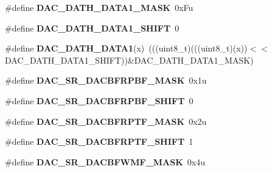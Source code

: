 \begin{DoxyCompactItemize}
\item 
\#define {\bfseries D\+A\+C\+\_\+\+D\+A\+T\+H\+\_\+\+D\+A\+T\+A1\+\_\+\+M\+A\+SK}~0x\+Fu\hypertarget{group__DAC__Register__Masks_ga98c0e999ae86d666b5d6fa8df700ba6f}{}\label{group__DAC__Register__Masks_ga98c0e999ae86d666b5d6fa8df700ba6f}

\item 
\#define {\bfseries D\+A\+C\+\_\+\+D\+A\+T\+H\+\_\+\+D\+A\+T\+A1\+\_\+\+S\+H\+I\+FT}~0\hypertarget{group__DAC__Register__Masks_ga0056432036b350d3839554982acfbff1}{}\label{group__DAC__Register__Masks_ga0056432036b350d3839554982acfbff1}

\item 
\#define {\bfseries D\+A\+C\+\_\+\+D\+A\+T\+H\+\_\+\+D\+A\+T\+A1}(x)~(((uint8\+\_\+t)(((uint8\+\_\+t)(x))$<$$<$D\+A\+C\+\_\+\+D\+A\+T\+H\+\_\+\+D\+A\+T\+A1\+\_\+\+S\+H\+I\+FT))\&D\+A\+C\+\_\+\+D\+A\+T\+H\+\_\+\+D\+A\+T\+A1\+\_\+\+M\+A\+SK)\hypertarget{group__DAC__Register__Masks_ga22ebc926dfe59f28a37b532767780fbc}{}\label{group__DAC__Register__Masks_ga22ebc926dfe59f28a37b532767780fbc}

\item 
\#define {\bfseries D\+A\+C\+\_\+\+S\+R\+\_\+\+D\+A\+C\+B\+F\+R\+P\+B\+F\+\_\+\+M\+A\+SK}~0x1u\hypertarget{group__DAC__Register__Masks_ga5af56fd75a9c5b74fe07c8f303d452aa}{}\label{group__DAC__Register__Masks_ga5af56fd75a9c5b74fe07c8f303d452aa}

\item 
\#define {\bfseries D\+A\+C\+\_\+\+S\+R\+\_\+\+D\+A\+C\+B\+F\+R\+P\+B\+F\+\_\+\+S\+H\+I\+FT}~0\hypertarget{group__DAC__Register__Masks_ga5581f254327f3d4e57b161b5c771fb1c}{}\label{group__DAC__Register__Masks_ga5581f254327f3d4e57b161b5c771fb1c}

\item 
\#define {\bfseries D\+A\+C\+\_\+\+S\+R\+\_\+\+D\+A\+C\+B\+F\+R\+P\+T\+F\+\_\+\+M\+A\+SK}~0x2u\hypertarget{group__DAC__Register__Masks_ga662e824677c1a7a94ddd36e90f3d37d5}{}\label{group__DAC__Register__Masks_ga662e824677c1a7a94ddd36e90f3d37d5}

\item 
\#define {\bfseries D\+A\+C\+\_\+\+S\+R\+\_\+\+D\+A\+C\+B\+F\+R\+P\+T\+F\+\_\+\+S\+H\+I\+FT}~1\hypertarget{group__DAC__Register__Masks_gad1df4286616f5369388e865f5f821ae9}{}\label{group__DAC__Register__Masks_gad1df4286616f5369388e865f5f821ae9}

\item 
\#define {\bfseries D\+A\+C\+\_\+\+S\+R\+\_\+\+D\+A\+C\+B\+F\+W\+M\+F\+\_\+\+M\+A\+SK}~0x4u\hypertarget{group__DAC__Register__Masks_ga612ec408d340d5011ff4326eda077ae3}{}\label{group__DAC__Register__Masks_ga612ec408d340d5011ff4326eda077ae3}


\end{DoxyCompactItemize}

